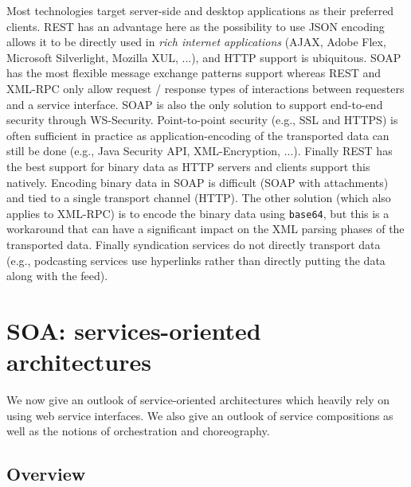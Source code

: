 Most technologies target server-side and desktop applications as their preferred clients. REST has an advantage here as the possibility to use JSON encoding allows it to be directly used in \emph{rich internet applications} (AJAX, Adobe Flex, Microsoft Silverlight, Mozilla XUL, ...), and HTTP support is ubiquitous. SOAP has the most flexible message exchange patterns support whereas REST and XML-RPC only allow request / response types of interactions between requesters and a service interface. SOAP is also the only solution to support end-to-end security through WS-Security. Point-to-point security (e.g., SSL and HTTPS) is often sufficient in practice as application-encoding of the transported data can still be done (e.g., Java Security API, XML-Encryption, ...). Finally REST has the best support for binary data as HTTP servers and clients support this natively. Encoding binary data in SOAP is difficult (SOAP with attachments) and tied to a single transport channel (HTTP). The other solution (which also applies to XML-RPC) is to encode the binary data using \texttt{base64}, but this is a workaround that can have a significant impact on the XML parsing phases of the transported data. Finally syndication services do not directly transport data (e.g., podcasting services use hyperlinks rather than directly putting the data along with the feed).\\


\section{SOA: services-oriented architectures}


We now give an outlook of service-oriented architectures which heavily rely on using web service interfaces. We also give an outlook of service compositions as well as the notions of orchestration and choreography.\\


\subsection{Overview}


